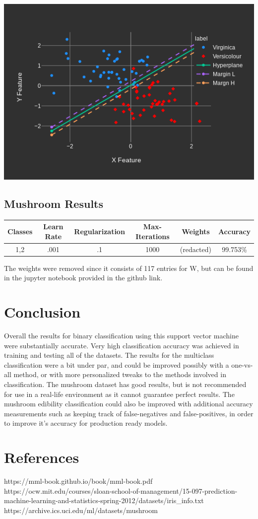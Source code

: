 \documentclass[12pt]{article}%
\begin{document}
	\includegraphics[scale=.3]{./iris3.png}
	
	\subsection{Mushroom Results}
		\begin{center}
		\begin{tabular}{||c c c c c c||} 
			\hline
			Classes & Learn Rate & Regularization & Max-Iterations & Weights & Accuracy\\ [0.5ex] 
			\hline\hline
			1,2 & .001 & .1 & 1000 & (redacted) & 99.753\% \\ [1ex] 
			\hline
		\end{tabular}
	\end{center}
	The weights were removed since it consists of 117 entries for W, but can be found in the jupyter notebook provided in the github link.
	\section{Conclusion}
	Overall the results for binary classification using this support vector machine were substantially accurate.  Very high classification accuracy was achieved in training and testing all of the datasets.  The results for the multiclass classification were a bit under par, and could be improved possibly with a one-vs-all method, or with more personalized tweaks to the methods involved in classification.  The mushroom dataset has good results, but is not recommended for use in a real-life environment as it cannot guarantee perfect results.  The mushroom edibility classification could also be improved with additional accuracy measurements such as keeping track of false-negatives and false-positives, in order to improve it's accuracy for production ready models.
	
	\section{References}
	https://mml-book.github.io/book/mml-book.pdf\\
	https://ocw.mit.edu/courses/sloan-school-of-management/15-097-prediction-machine-learning-and-statistics-spring-2012/datasets/iris\_info.txt\\
	https://archive.ics.uci.edu/ml/datasets/mushroom
	
\end{document}
